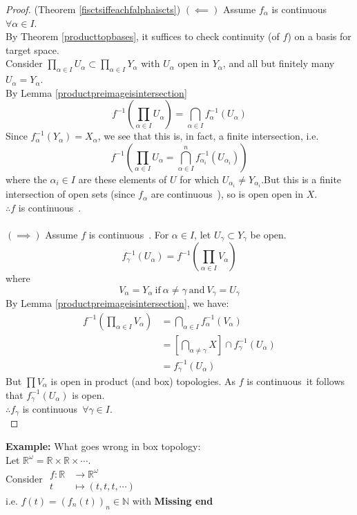 \documentclass{article}
\let\ddd\cdots
\newcommand{\R}{\mathbb{R}}
\newcommand{\N}{\mathbb{N}}
\newcommand{\cts}{continuous\ }
\theoremstyle{remark}
\theoremstyle{example}
\theoremstyle{examples}
\begin{document}
	\begin{proof}(Theorem \ref{fisctsiffeachfalphaiscts})
			$(\impliedby)$ Assume $f_\alpha$ is \cts $\forall \alpha \in I$.\\
			By Theorem \ref{producttopbases}, it suffices to check continuity (of $f$) on a basis for target space.\\
			Consider $\prod_{\alpha \in I} U_\alpha \subset \prod_{\alpha \in I} Y_\alpha$ with $U_\alpha$ open in $Y_\alpha$, and all but finitely many $U_\alpha=Y_\alpha$.\\
			By Lemma \ref{productpreimageisintersection} \[f^{-1} \left(\prod_{\alpha \in I}U_\alpha\right)=\bigcap_{\alpha \in I} f_\alpha^{-1}\left(U_\alpha\right)\]
			Since $f_\alpha^{-1}(Y_\alpha)=X_\alpha$, we see that this is, in fact, a finite intersection, i.e.
			\[ f^{-1} \left( \prod_{\alpha \in I}U_\alpha = \bigcap_{\alpha \in I}^nf_{\alpha_i}^{-1}\left(U_{\alpha_i}\right) \right)\] where the $\alpha_i \in I$ are these elements of $U$ for which $U_{\alpha_i} \neq Y_{\alpha_i}$.But this is a finite intersection of open sets (since $f_\alpha$ are \cts), so is open open in $X$.\\
			$\therefore f$ is \cts.\\
			\\
			$(\implies)$ Assume $f$ is \cts. For $\alpha \in I$, let $U_\gamma \subset Y_\gamma$ be open. \[f_\gamma^{-1}\left(U_\alpha\right) = f^{-1}\left(\prod_{\alpha \in I} V_\alpha\right) \] where \[V_\alpha = Y_\alpha\ \mathrm{if}\ \alpha \neq \gamma\ \mathrm{and}\ V_\gamma = U_\gamma \]
			By Lemma \ref{productpreimageisintersection}, we have:
			\begin{align*}
				f^{-1}\left(\prod_{\alpha \in I}V_\alpha\right) &= \bigcap_{\alpha \in I}f_\alpha^{-1}(V_\alpha)\\
				& = \left[ \bigcap_{\alpha \neq \gamma} X \right] \cap f_\gamma^{-1}(U_\alpha)\\
				&= f_\gamma^{-1}(U_\alpha)
			\end{align*}
			But $\prod V_\alpha$ is open in product (and box) topologies. As $f$ is \cts it follows that $f_\gamma^{-1}(U_\alpha)$ is open.\\
			$\therefore f_\gamma$ is \cts $\forall \gamma \in I$.\\
	\end{proof}

	\textbf{Example:} What goes wrong in box topology:\\
		Let $\R^\omega = \R \times \R \times \ddd$.\\
		Consider $\begin{aligned}
			f:\R &\to \R^\omega\\
			t & \mapsto (t,t,t,\ddd)
		\end{aligned}$\\
		i.e. $f(t)=(f_n(t))_n \in \N$ with 
		\textbf{Missing end}
		
\end{document}

